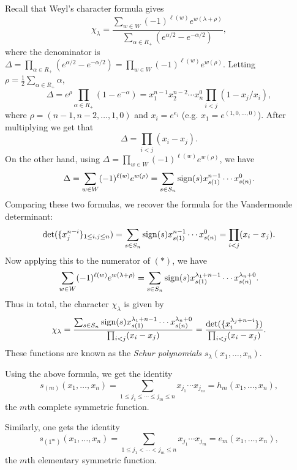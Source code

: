 \begin{remark}
  Recall that Weyl's character formula
  gives
  \[
    \chi_{\lambda}
    = \frac{\sum_{w \in W} (-1)^{\ell(w)} e^{w(\lambda + \rho)}}
    {\sum_{\alpha \in R_+} (e^{\alpha / 2} - e^{-\alpha / 2})}, \tag{$*$}
  \]
  where the denominator
  is $\Delta = \prod_{\alpha \in R_+} (e^{\alpha / 2} - e^{-\alpha / 2}) = \prod_{w \in W} (-1)^{\ell(w)} e^{w(\rho)}$.
  Letting $\rho = \frac{1}{2} \sum_{\alpha \in R_+} \alpha$,
  \[
    \Delta = e^\rho \prod_{\alpha \in R_+} (1 - e^{-\alpha})
    = x_1^{n - 1} x_2^{n - 2} \cdots x_n^0
    \prod_{i < j} (1 - x_j / x_i),
  \]
  where $\rho = (n - 1, n - 2, \dots, 1, 0)$
  and $x_i = e^{e_i}$ (e.g.
  $x_1 = e^{(1, 0, \dots, 0)}$).
  After multiplying we get that
  \[
    \Delta = \prod_{i < j} (x_i - x_j).
  \]
  On the other hand, using
  $\Delta = \prod_{w \in W} (-1)^{\ell(w)} e^{w(\rho)}$,
  we have
  \[
    \Delta = \sum_{w \in W} (-1)^{\ell(w)} e^{w(\rho)}
    = \sum_{s \in S_n} \operatorname{sign}(s) x^{n - 1}_{s(1)} \cdots x^0_{s(n)}.
  \]
  Comparing these two formulas,
  we recover the formula for the
  Vandermonde determinant:
  \[
    \det(\{x_j^{n - i}\}_{1 \le i, j \le n})
    = \sum_{s \in S_n} \operatorname{sign}(s) x^{n - 1}_{s(1)} \cdots x^0_{s(n)}
    = \prod_{i < j} (x_i - x_j).
  \]
  Now applying this to the numerator of
  $(*)$, we have
  \[
    \sum_{w \in W} (-1)^{\ell(w)} e^{w(\lambda + \rho)}
    = \sum_{s \in S_n} \operatorname{sign}(s) x^{\lambda_1 + n - 1}_{s(1)} \cdots x^{\lambda_n + 0}_{s(n)}.
  \]
  Thus in total, the
  character $\chi_{\lambda}$ is given by
  \[
    \chi_{\lambda}
    = \frac{\sum_{s \in S_n} \operatorname{sign}(s) x^{\lambda_1 + n - 1}_{s(1)} \cdots x^{\lambda_n + 0}_{s(n)}}
    {\prod_{i < j} (x_i - x_j)}
    = \frac{\det(\{x_i^{\lambda_j + n - i}\})}{\prod_{i < j} (x_i - x_j)}.
  \]
  These functions are known as the
  \emph{Schur polynomials}
  $s_\lambda(x_1, \dots, x_n)$.
\end{remark}

\begin{example}[Character of $S^m V$]
  Using the above formula, we get the identity
  \[
    s_{(m)}(x_1, \dots, x_n)
    = \sum_{1 \le j_1 \le \cdots \le j_m \le n} x_{j_1} \cdots x_{j_m}
    = h_m(x_1, \dots, x_n),
  \]
  the $m$th complete symmetric function.
\end{example}

\begin{example}
  Similarly, one gets the identity
  \[
    s_{(1^m)}(x_1, \dots, x_n)
    = \sum_{1 \le j_1 < \cdots < j_m \le n} x_{j_1} \cdots x_{j_m}
    = e_m(x_1, \dots, x_n),
  \]
  the $m$th elementary symmetric function.
\end{example}

